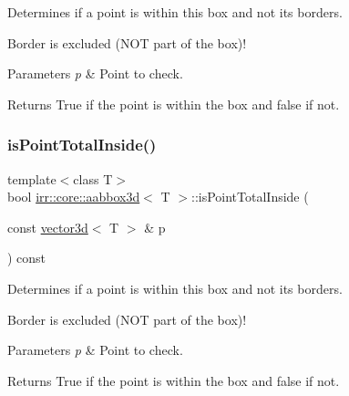 Determines if a point is within this box and not its borders. 

Border is excluded (N\+OT part of the box)! 
\begin{DoxyParams}{Parameters}
{\em p} & Point to check. \\
\hline
\end{DoxyParams}
\begin{DoxyReturn}{Returns}
True if the point is within the box and false if not. 
\end{DoxyReturn}
\mbox{\label{classirr_1_1core_1_1aabbox3d_a0be7a03228c7af1e6c563acea4af316e}} 
\subsubsection{\texorpdfstring{is\+Point\+Total\+Inside()}{isPointTotalInside()}\hspace{0.1cm}{\footnotesize\ttfamily [2/2]}}
{\footnotesize\ttfamily template$<$class T$>$ \\
bool \hyperlink{classirr_1_1core_1_1aabbox3d}{irr\+::core\+::aabbox3d}$<$ T $>$\+::is\+Point\+Total\+Inside (\begin{DoxyParamCaption}\item[{const \hyperlink{classirr_1_1core_1_1vector3d}{vector3d}$<$ T $>$ \&}]{p }\end{DoxyParamCaption}) const\hspace{0.3cm}{\ttfamily [inline]}}



Determines if a point is within this box and not its borders. 

Border is excluded (N\+OT part of the box)! 
\begin{DoxyParams}{Parameters}
{\em p} & Point to check. \\
\hline
\end{DoxyParams}
\begin{DoxyReturn}{Returns}
True if the point is within the box and false if not. 
\end{DoxyReturn}
\mbox{\label{classirr_1_1core_1_1aabbox3d_a985eec4fb632d7c8ef5a5577209690b3}} 
